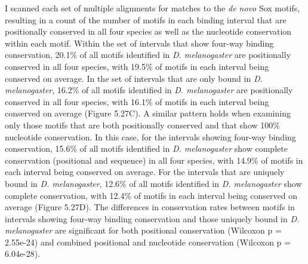 I scanned each set of multiple alignments for matches to the \emph{de novo} Sox motifs, resulting in a count of the number of motifs in each binding interval that are positionally conserved in all four species as well as the nucleotide conservation within each motif. Within the set of intervals that show four-way binding conservation, 20.1\% of all motifs identified in \emph{D. melanogaster} are positionally conserved in all four species, with 19.5\% of motifs in each interval being conserved on average. In the set of intervals that are only bound in \emph{D. melanogaster}, 16.2\% of all motifs identified in \emph{D. melanogaster} are positionally conserved in all four species, with 16.1\% of motifs in each interval being conserved on average (Figure 5.27C). A similar pattern holds when examining only those motifs that are both positionally conserved and that show 100\% nucleotide conservation. In this case, for the intervals showing four-way binding conservation, 15.6\% of all motifs identified in \emph{D. melanogaster} show complete conservation (positional and sequence) in all four species, with 14.9\% of motifs in each interval being conserved on average. For the intervals that are uniquely bound in \emph{D. melanogaster}, 12.6\% of all motifs identified in \emph{D. melanogaster} show complete conservation, with 12.4\% of motifs in each interval being conserved on average (Figure 5.27D). The differences in conservation rates between motifs in intervals showing four-way binding conservation and those uniquely bound in \emph{D. melanogaster} are significant for both positional conservation (Wilcoxon p = 2.55e-24) and combined positional and nucleotide conservation (Wilcoxon p = 6.04e-28).\\

